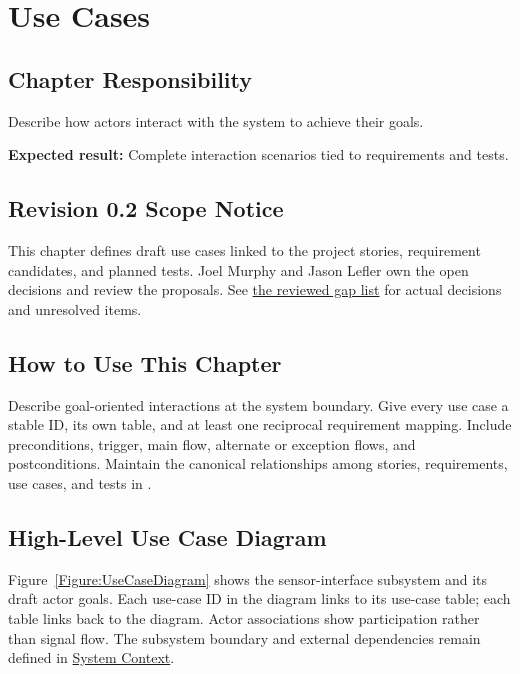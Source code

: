 \chapter{Use Cases}
\section{Chapter Responsibility}
\label{Section:UseCasesResponsibility}
Describe how actors interact with the system to achieve their goals.

\noindent\textbf{Expected result:} Complete interaction scenarios tied to requirements and tests.

\section{Revision 0.2 Scope Notice}
\label{Section:DeferredUseCases}
\begin{fsaNote}
This chapter defines draft use cases linked to the project stories,
requirement candidates, and planned tests. Joel Murphy and Jason Lefler own
the open decisions and review the proposals.
See \hyperref[Table:ProjectGapReview]{the reviewed gap list} for actual
decisions and unresolved items.
\end{fsaNote}

\section{How to Use This Chapter}
Describe goal-oriented interactions at the system boundary. Give every use case
a stable ID, its own table, and at least one reciprocal requirement mapping.
Include preconditions, trigger, main flow, alternate or exception flows, and
postconditions. Maintain the canonical relationships among stories,
requirements, use cases, and tests in .

\section[High-Level Use Case Diagram]{\hspace{0.5em}High-Level Use Case Diagram}
\label{Section:ProjectUseCaseDiagram}
Figure~\ref{Figure:UseCaseDiagram} shows the sensor-interface subsystem and
its draft actor goals. Each use-case ID in the diagram links to its
use-case table; each table links back to the diagram. Actor associations
show participation rather than signal flow. The subsystem boundary and
external dependencies remain defined in
\hyperref[Section:ProjectSystemBoundary]{System Context}.


